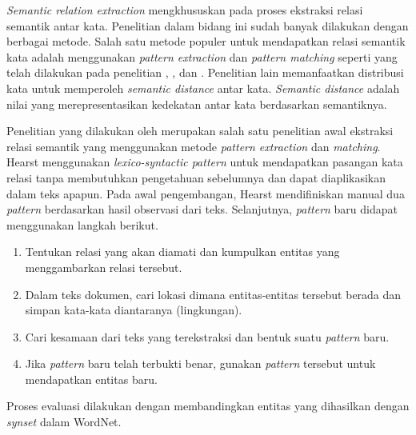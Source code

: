 \textit{Semantic relation extraction} mengkhususkan pada proses ekstraksi relasi semantik antar kata. Penelitian dalam bidang ini sudah banyak dilakukan dengan berbagai metode. Salah satu metode populer untuk mendapatkan relasi semantik kata adalah menggunakan \textit{pattern extraction} dan \textit{pattern matching} seperti yang telah dilakukan pada penelitian \cite{hearst1992automatic}, \cite{ruiz2005automatic}, dan \cite{arnold2014extracting}. Penelitian lain memanfaatkan distribusi kata untuk memperoleh \textit{semantic distance} antar kata. \textit{Semantic distance} adalah nilai yang merepresentasikan kedekatan antar kata berdasarkan semantiknya.

Penelitian yang dilakukan oleh \cite{hearst1992automatic} merupakan salah satu penelitian awal ekstraksi relasi semantik yang menggunakan metode \textit{pattern extraction} dan \textit{matching}. Hearst menggunakan \textit{lexico-syntactic pattern} untuk mendapatkan pasangan kata relasi tanpa membutuhkan pengetahuan sebelumnya dan dapat diaplikasikan dalam teks apapun. Pada awal pengembangan, Hearst mendifiniskan manual dua \textit{pattern} berdasarkan hasil observasi dari teks. Selanjutnya, \textit{pattern} baru didapat menggunakan langkah berikut. 
\begin{enumerate}
  \item Tentukan relasi yang akan diamati dan kumpulkan entitas yang menggambarkan relasi tersebut.
  \item Dalam teks dokumen, cari lokasi dimana entitas-entitas tersebut berada dan simpan kata-kata diantaranya (lingkungan).
  \item Cari kesamaan dari teks yang terekstraksi dan bentuk suatu \textit{pattern} baru.
  \item Jika \textit{pattern} baru telah terbukti benar, gunakan \textit{pattern} tersebut untuk mendapatkan entitas baru.
\end{enumerate}
Proses evaluasi dilakukan dengan membandingkan entitas yang dihasilkan dengan \textit{synset} dalam WordNet. 

